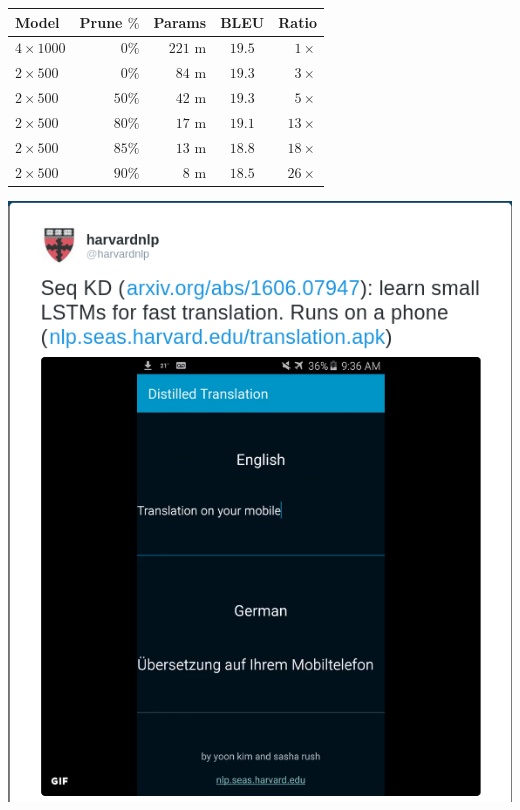 \documentclass{beamer}
\newcommand{\air}{\vspace{0.25cm}}
\newcommand{\Cite}[1]{{\footnotesize \citep{#1}}}
\begin{document}
\begin{frame}
\centerline{ \Cite{See2016}}
\air
\air
\begin{table}[t] \label{prune}
\centering
\small
\begin{tabular}{l  r  r c  r }
\toprule
Model & Prune $\%$ & Params & BLEU & Ratio \\
\midrule 
$4 \times 1000$ & $0\%$ &$221$ m& $19.5$& $1 \times$   \\
$2 \times 500$ &  $0\%$& $84$ m& $19.3$& $3 \times$   \\
$2 \times 500$ & $50\%$& $42$ m&  $19.3$ & $5 \times$ \\
$2 \times 500$ &  $80\%$& $17$ m&  $19.1$ & $13 \times$ \\
$2 \times 500$ &  $85\%$& $13$ m&  $18.8$ & $18 \times$ \\
$2 \times 500$ &  $90\%$& $8$ m &  $18.5$  & $26 \times$ \\

\bottomrule
\end{tabular}
\end{table}
\end{frame}


\begin{frame}
  
  \begin{center}
    \includegraphics[height=0.9\textheight]{phonemt}
  \end{center}
\end{frame}
\end{document}
